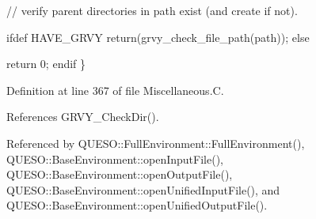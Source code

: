 // verify parent directories in path exist (and create if not).

ifdef H\-A\-V\-E\-\_\-\-G\-R\-V\-Y return(grvy\-\_\-check\-\_\-file\-\_\-path(path)); else

return 0; endif \} 

Definition at line 367 of file Miscellaneous.\-C.



References G\-R\-V\-Y\-\_\-\-Check\-Dir().



Referenced by Q\-U\-E\-S\-O\-::\-Full\-Environment\-::\-Full\-Environment(), Q\-U\-E\-S\-O\-::\-Base\-Environment\-::open\-Input\-File(), Q\-U\-E\-S\-O\-::\-Base\-Environment\-::open\-Output\-File(), Q\-U\-E\-S\-O\-::\-Base\-Environment\-::open\-Unified\-Input\-File(), and Q\-U\-E\-S\-O\-::\-Base\-Environment\-::open\-Unified\-Output\-File().



